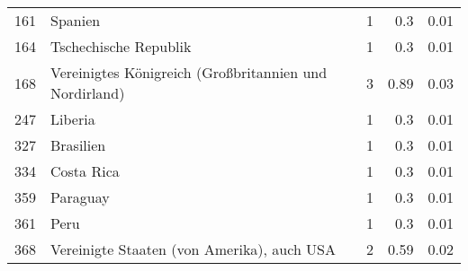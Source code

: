 \begin{longtable}{lXrrr}
        161 & \multicolumn{1}{X}{Spanien} & %
          \num{1} &
          \num[round-mode=places,round-precision=2]{0.3} &
          \num[round-mode=places,round-precision=2]{0.01} \\

        164 & \multicolumn{1}{X}{Tschechische Republik} & %
          \num{1} &
          \num[round-mode=places,round-precision=2]{0.3} &
          \num[round-mode=places,round-precision=2]{0.01} \\

        168 & \multicolumn{1}{X}{Vereinigtes Königreich (Großbritannien und Nordirland)} & %
          \num{3} &
          \num[round-mode=places,round-precision=2]{0.89} &
          \num[round-mode=places,round-precision=2]{0.03} \\

        247 & \multicolumn{1}{X}{Liberia} & %
          \num{1} &
          \num[round-mode=places,round-precision=2]{0.3} &
          \num[round-mode=places,round-precision=2]{0.01} \\

        327 & \multicolumn{1}{X}{Brasilien} & %
          \num{1} &
          \num[round-mode=places,round-precision=2]{0.3} &
          \num[round-mode=places,round-precision=2]{0.01} \\

        334 & \multicolumn{1}{X}{Costa Rica} & %
          \num{1} &
          \num[round-mode=places,round-precision=2]{0.3} &
          \num[round-mode=places,round-precision=2]{0.01} \\

        359 & \multicolumn{1}{X}{Paraguay} & %
          \num{1} &
          \num[round-mode=places,round-precision=2]{0.3} &
          \num[round-mode=places,round-precision=2]{0.01} \\

        361 & \multicolumn{1}{X}{Peru} & %
          \num{1} &
          \num[round-mode=places,round-precision=2]{0.3} &
          \num[round-mode=places,round-precision=2]{0.01} \\

        368 & \multicolumn{1}{X}{Vereinigte Staaten (von Amerika), auch USA} & %
          \num{2} &
          \num[round-mode=places,round-precision=2]{0.59} &
          \num[round-mode=places,round-precision=2]{0.02} \\


\end{longtable}
